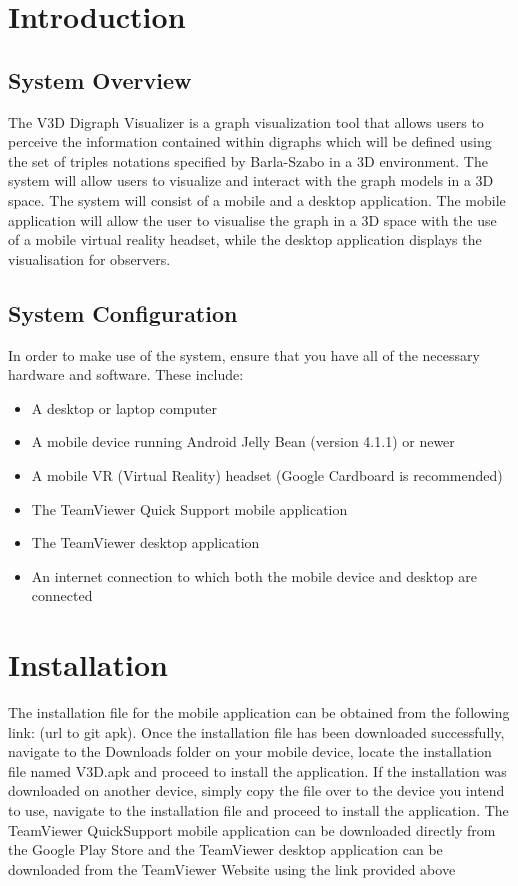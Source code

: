 \documentclass[english]{article}
\begin{document}

\newpage
{}
\thispagestyle{empty}
\tableofcontents
\clearpage

\setcounter{page}{1}

\section{Introduction}
\subsection{System Overview}
The V3D Digraph Visualizer is a graph visualization tool that allows users to perceive the information contained within digraphs which will be defined using the set of triples notations specified by Barla-Szabo in a 3D environment. The system will allow users to visualize and interact with the graph models in a 3D space. The system will consist of a mobile and a desktop application. The mobile application will allow the user to visualise the graph in a 3D space with the use of a mobile virtual reality headset, while the desktop application displays the visualisation for observers.

\subsection{System Configuration}
\begin{flushleft}
In order to make use of the system, ensure that you have all of the necessary hardware and software. These include:

\begin{itemize}
  \item A desktop or laptop computer
  \item A mobile device running Android Jelly Bean (version 4.1.1) or newer
  \item A mobile VR (Virtual Reality) headset (Google Cardboard is recommended)
  \item The TeamViewer Quick Support mobile application
  \item The TeamViewer desktop application
  \item An internet connection to which both the mobile device and desktop are connected
\end{itemize}
\end{flushleft}
\section{Installation}
The installation file for the mobile application can be obtained from the following link: (url to git apk). Once the installation file has been downloaded successfully, navigate to the Downloads folder on your mobile device, locate the installation file named V3D.apk and proceed to install the application. If the installation was downloaded on another device, simply copy the file over to the device you intend to use, navigate to the installation file and proceed to install the application. The TeamViewer QuickSupport mobile application can be downloaded directly from the Google Play Store and the TeamViewer desktop application can be downloaded from the TeamViewer Website using the link provided above 
 
\end{document}
